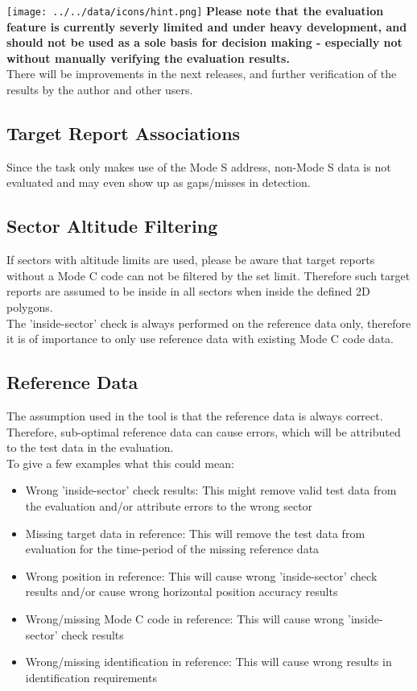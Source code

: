 \texttt{[image: ../../data/icons/hint.png]} \textbf{Please note that the evaluation feature is currently severly limited and under heavy development, and should not be used as a sole basis for decision making - especially not without manually verifying the evaluation results.} \\

There will be improvements in the next releases, and further verification of the results by the author and other users.

\subsection{Target Report Associations}

Since the task only makes use of the Mode S address, non-Mode S data is not evaluated and may even show up as gaps/misses in detection.

\subsection{Sector Altitude Filtering}

If sectors with altitude limits are used, please be aware that target reports without a Mode C code can not be filtered by the set limit. Therefore such target reports are assumed to be inside in all sectors when inside the defined 2D polygons. \\

The 'inside-sector' check is always performed on the reference data only, therefore it is of importance to only use reference data with existing Mode C code data.

\subsection{Reference Data}

The assumption used in the tool is that the reference data is always correct. Therefore, sub-optimal reference data can cause errors, which will be attributed to the test data in the evaluation. \\

To give a few examples what this could mean:
\begin{itemize}  
\item Wrong 'inside-sector' check results: This might remove valid test data from the evaluation and/or attribute errors to the wrong sector
\item Missing target data in reference: This will remove the test data from evaluation for the time-period of the missing reference data
\item Wrong position in reference: This will cause wrong 'inside-sector' check results and/or cause wrong horizontal position accuracy results
\item Wrong/missing Mode C code in reference: This will cause wrong 'inside-sector' check results
\item Wrong/missing identification in reference: This will cause wrong results in identification requirements
\end{itemize}
\ \\

